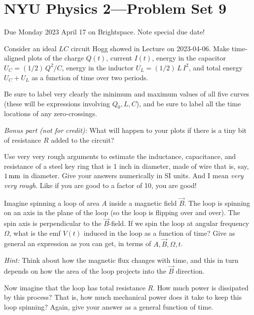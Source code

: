 \documentclass[12pt]{article}
\begin{document}
\section*{NYU Physics 2---Problem Set 9}

Due Monday 2023 April 17 on Brightspace. Note special due date!

\startproblem%
Consider an ideal $LC$ circuit Hogg showed in Lecture on
2023-04-06.  Make time-aligned plots of the charge
$Q(t)$, current $I(t)$, energy in the capacitor $U_C=(1/2)\,Q^2/C$,
energy in the inductor $U_L=(1/2)\,L\,I^2$, and total energy $U_C+U_L$
as a function of time over two periods.

Be sure to label very clearly the minimum and maximum values of all
five curves (these will be expressions involving $Q_0, L, C$), and be
sure to label all the time locations of any zero-crossings.

\textsl{Bonus part (not for credit):} What will happen to your plots
if there is a tiny bit of resistance $R$ added to the circuit?

\startproblem%
Use very very rough arguments to estimate the inductance, capacitance,
and resistance of a steel key ring that is 1 inch in diameter, made of
wire that is, say, $1\,\mathrm{mm}$ in diameter. Give your answers numerically
in SI units.
And I mean \emph{very very rough}. Like if you are good to a factor of
10, you are good!

\startproblem%
Imagine spinning a loop of area $A$ inside a magnetic field $\vec{B}$.
The loop is spinning on an axis in the plane of the loop (so the loop
is flipping over and over).  The spin axis is perpendicular to the
$\vec{B}$-field.  If we spin the loop at angular frequency $\Omega$,
what is the emf $V(t)$ induced in the loop as a function of time? Give as
general an expression as you can get, in terms of $A, \vec{B}, \Omega, t$.

\textsl{Hint:} Think about how the magnetic flux changes with time,
and this in turn depends on how the area of the loop projects into the
$\vec{B}$ direction.

Now imagine that the loop has total resistance $R$. How much power is
dissipated by this process? That is, how much mechanical power does it
take to keep this loop spinning? Again, give your answer as a general function of time.
\end{document}
